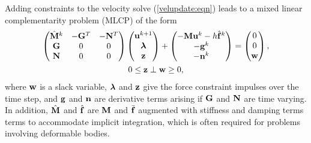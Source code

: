 Adding constraints to the velocity solve (\ref{velupdate:eqn})
leads to a mixed linear complementarity problem (MLCP)
of the form
\begin{gather}
\left(
\begin{matrix}
\hat{{\bf M}}^{k} & -{\bf G}^{T} & -{\bf N}^{T} \\
{\bf G} & 0 & 0 \\
{\bf N} & 0 & 0 
\end{matrix}
\right)
\left(
\begin{matrix}
{\bf u}^{k+1} \\
\boldsymbol\lambda \\
{\bf z}
\end{matrix}
\right)
+
\left(
\begin{matrix}
-{\bf M} {\bf u}^{k} - h \hat{{\bf f}}^{k} \\
-{\bf g}^k \\
-{\bf n}^k
\end{matrix}
\right)
=
\left(
\begin{matrix}
0 \\
0 \\
{\bf w}
\end{matrix}
\right), \notag \\
0 \le {\bf z} \perp {\bf w} \ge 0,
\label{KKTvelocity:eqn}
\end{gather}
where ${\bf w}$ is a slack variable, $\boldsymbol\lambda$ and ${\bf z}$ give the force
constraint impulses over the time step, and ${\bf g}$ and ${\bf n}$ are derivative
terms arising if ${\bf G}$ and ${\bf N}$ are time varying.  In addition,
$\hat{{\bf M}}$ and $\hat{{\bf f}}$ are ${\bf M}$ and $\bar{{\bf f}}$ augmented with stiffness
and damping terms terms to accommodate implicit integration, which
is often required for problems involving deformable bodies.

